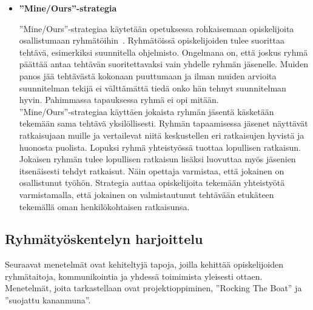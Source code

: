 \documentclass[finnish]{../tktltiki2}
\theoremstyle{definition}
\theoremstyle{remark}
\begin{document}
\begin{itemize}
\item {\bf ''Mine/Ours''-strategia}

''Mine/Ours''-strategiaa käytetään opetuksessa rohkaisemaan
opiskelijoita osallistumaan ryhmätöihin~\cite{1158709}. Ryhmätöissä opiskelijoiden tulee suorittaa tehtävä, esimerkiksi suunnitella ohjelmisto. Ongelmana on, että joskus ryhmä päättää antaa tehtävän suoritettavaksi vain yhdelle ryhmän jäsenelle. Muiden panos jää tehtävästä kokonaan puuttumaan ja ilman muiden arvioita suunnitelman tekijä ei välttämättä tiedä onko hän tehnyt suunnitelman hyvin. Pahimmassa tapauksessa ryhmä ei opi mitään.\\

''Mine/Ours''-strategiaa käyttäen jokaista ryhmän jäsentä käsketään tekemään sama tehtävä yksilöllisesti. Ryhmän tapaamisessa jäsenet näyttävät ratkaisujaan muille ja vertailevat niitä keskustellen eri ratkaisujen hyvistä ja huonosta puolista. Lopuksi ryhmä yhteistyössä tuottaa lopullisen ratkaisun. Jokaisen ryhmän tulee lopullisen ratkaisun lisäksi luovuttaa myös jäsenien itsenäisesti tehdyt ratkaisut. Näin opettaja varmistaa, että jokainen on osallistunut työhön. Strategia auttaa opiskelijoita tekemään yhteistyötä varmistamalla, että jokainen on valmistautunut tehtävään etukäteen tekemällä oman henkilökohtaisen ratkaisunsa. 

\end{itemize}

\subsection{Ryhmätyöskentelyn harjoittelu}

Seuraavat menetelmät ovat kehiteltyjä tapoja, joilla kehittää
opiskelijoiden ryhmätaitoja, kommunikointia ja yhdessä toimimista
yleisesti ottaen. Menetelmät, joita tarkastellaan ovat 
projektioppiminen, ''Rocking The Boat'' ja ''suojattu kananmuna''.
\end{document}
